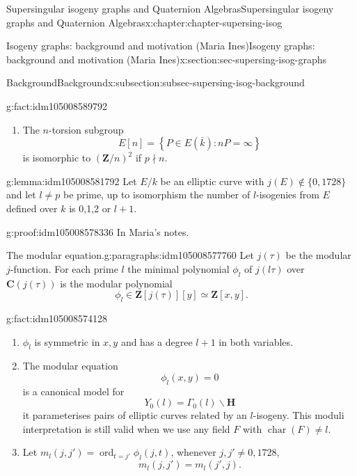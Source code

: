 \documentclass[oneside,10pt,]{book}
\numberwithin{equation}{section}
\newcommand{\lb}{[}
\newcommand{\rb}{]}
\newcommand{\ZZ}{\mathbf{Z}}
\newcommand{\CC}{\mathbf{C}}
\newcommand{\HH}{\mathbf{H}}
\DeclareMathOperator{\characteristic}{char}
\DeclareMathOperator{\ord}{ord}
\begin{document}
\begin{chapterptx}{Supersingular isogeny graphs and Quaternion Algebras}{}{Supersingular isogeny graphs and Quaternion Algebras}{}{}{x:chapter:chapter-supersing-isog}
\begin{sectionptx}{Isogeny graphs: background and motivation (Maria Ines)}{}{Isogeny graphs: background and motivation (Maria Ines)}{}{}{x:section:sec-supersing-isog-graphs}
\begin{subsectionptx}{Background}{}{Background}{}{}{x:subsection:subsec-supersing-isog-background}
\begin{fact}{}{}{g:fact:idm105008589792}
\begin{enumerate}
\begin{equation*}
\end{equation*}
the multiplication-by-\(n \) map.%
\item{}The \(n\)-torsion subgroup%
\begin{equation*}
E\lb n \rb = \left\{ P \in E(\overline k) : nP = \infty\right\}
\end{equation*}
is isomorphic to \((\ZZ/n)^2\) if \(p\nmid n\).%
\end{enumerate}
%
\end{fact}
\begin{lemma}{}{}{g:lemma:idm105008581792}%
Let \(E/k\) be an elliptic curve with \(j(E) \not\in\{0,1728\}\) and let \(l\ne p\) be prime, up to isomorphism the number of \(l\)-isogenies from \(E\) defined over \(k\) is 0,1,2 or \(l+1\).%
\end{lemma}
\begin{proofptx}{}{g:proof:idm105008578336}
In Maria's notes.%
\end{proofptx}
\begin{paragraphs}{The modular equation.}{g:paragraphs:idm105008577760}%
Let \(j(\tau)\) be the modular \(j\)-function. For each prime \(l\) the minimal polynomial \(\phi_l\) of \(j(l\tau)\) over \(\CC (j(\tau))\) is the modular polynomial%
\begin{equation*}
\phi_l \in \ZZ[j(\tau)][y] \simeq \ZZ[x,y]\text{.}
\end{equation*}
%
\begin{fact}{}{}{g:fact:idm105008574128}%
%
\begin{enumerate}
\item{}\(\phi_l\) is symmetric in \(x,y\) and has a degree \(l+1\) in both variables.%
\item{}The modular equation%
\begin{equation*}
\phi_l (x,y) = 0
\end{equation*}
is a canonical model for%
\begin{equation*}
Y_0(l) = \Gamma_0(l) \backslash \HH
\end{equation*}
it parameterises pairs of elliptic curves related by an \(l\)-isogeny. This moduli interpretation is still valid when we use any field \(F\) with \(\characteristic(F) \ne l\).%
\item{}Let \(m_l(j,j') = \ord_{t = j'} \phi_l(j,t)\), whenever \(j,j' \ne 0,1728\),%
\begin{equation*}
m_l(j,j') = m_l(j',j)\text{.}
\end{equation*}
%
\end{enumerate}
%
\end{fact}

\end{paragraphs}
\end{subsectionptx}
\end{sectionptx}
\end{chapterptx}
\end{document}
